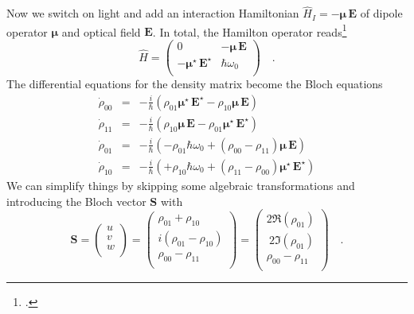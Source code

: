 Now we switch on light and add an interaction Hamiltonian $\hat{H}_I = -\boldsymbol{\mu} \, \boldsymbol{E}$ of dipole operator $\boldsymbol{\mu} $ and optical field   $\boldsymbol{E}$. In total, the Hamilton operator reads\footcite[chap. 3.8]{Rand2016}
\begin{equation}
 \hat{H } = \begin{pmatrix}
  0 & - {\boldsymbol{\mu}} \, \boldsymbol{E} \\ - {\boldsymbol{\mu}}^\star \, \boldsymbol{E}^\star & \hbar \omega_0 \\
 \end{pmatrix} \quad .
\end{equation}
The differential equations for the density matrix become the Bloch equations
\begin{eqnarray}
\dot{\rho}_{00} &=&  - \frac{i}{\hbar} \left( \rho_{01} \boldsymbol{\mu}^\star \, \boldsymbol{E}^\star - \rho_{10} \boldsymbol{\mu} \, \boldsymbol{E} \right) \\
%
\dot{\rho}_{11} &=&  - \frac{i}{\hbar} \left( \rho_{10} \boldsymbol{\mu} \, \boldsymbol{E} - \rho_{01} \boldsymbol{\mu}^\star \, \boldsymbol{E}^\star \right) \\
%
\dot{\rho}_{01} &=& - \frac{i}{\hbar}  \left( - \rho_{01} \hbar \omega_0 + (\rho_{00} - \rho_{11})  \boldsymbol{\mu} \, \boldsymbol{E}\right) \\
%
\dot{\rho}_{10} &=& - \frac{i}{\hbar}  \left( + \rho_{10} \hbar \omega_0 + (\rho_{11} - \rho_{00})  \boldsymbol{\mu}^\star \, \boldsymbol{E}^\star \right) 
%
\end{eqnarray}
We can simplify things by skipping some algebraic transformations and introducing the Bloch vector $\boldsymbol{S}$ with
\begin{equation}
\boldsymbol{S} = 
\begin{pmatrix}
u \\ v \\ w \\
\end{pmatrix}
= 
\begin{pmatrix}
\rho_{01} + \rho_{10} \\ i (\rho_{01} - \rho_{10}) \\ \rho_{00} - \rho_{11} \\
\end{pmatrix}
= 
\begin{pmatrix}
2 \Re (\rho_{01})  \\ \ 2 \Im (\rho_{01}) \\ \rho_{00} - \rho_{11} \\
\end{pmatrix} \quad .
\end{equation}
